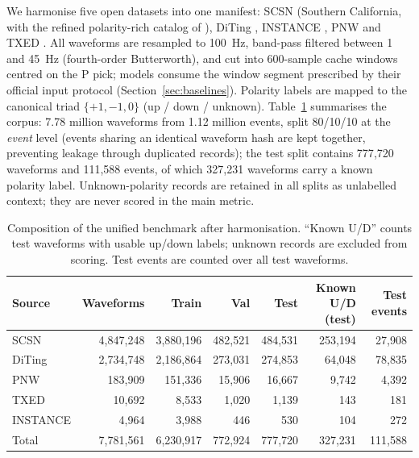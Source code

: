 \documentclass[11pt]{article}
\begin{document}
We harmonise five open datasets into one manifest:
SCSN (Southern California, with the refined polarity-rich catalog of
\citealp{ross2018,cheng2023focal}), DiTing \citep{zhao2023diting},
INSTANCE \citep{michelini2021instance}, PNW \citep{ni2023pnw} and TXED
\citep{chen2024txed}. All waveforms are resampled to \SI{100}{Hz}, band-pass
filtered between 1 and \SI{45}{Hz} (fourth-order Butterworth), and cut into
600-sample cache windows centred on the P pick; models consume the window
segment prescribed by their official input protocol
(Section~\ref{sec:baselines}). Polarity labels are mapped to the canonical
triad $\{+1, -1, 0\}$ (up / down / unknown). Table~\ref{tab:dataset}
summarises the corpus: 7.78 million waveforms from 1.12 million
events, split 80/10/10 at the \emph{event} level (events sharing an identical
waveform hash are kept together, preventing leakage through duplicated
records); the test split contains 777{,}720 waveforms and
111{,}588 events, of which 327{,}231 waveforms carry a known polarity
label. Unknown-polarity records are retained in all splits as unlabelled
context; they are never scored in the main metric.

\begin{table}[t]
  \centering
  \caption{Composition of the unified benchmark after harmonisation.
  ``Known U/D'' counts test waveforms with usable up/down labels; unknown
  records are excluded from scoring. Test events are counted over all test
  waveforms.}
  \label{tab:dataset}
  \small
  \begin{tabular}{lrrrrrr}
    \toprule
    Source & Waveforms & Train & Val & Test & Known U/D (test) & Test events \\
    \midrule
    SCSN     & 4{,}847{,}248 & 3{,}880{,}196 & 482{,}521 & 484{,}531 & 253{,}194 & 27{,}908 \\
    DiTing   & 2{,}734{,}748 & 2{,}186{,}864 & 273{,}031 & 274{,}853 & 64{,}048 & 78{,}835 \\
    PNW      &   183{,}909 &   151{,}336 &  15{,}906 &  16{,}667 & 9{,}742 & 4{,}392 \\
    TXED     &    10{,}692 &     8{,}533 &   1{,}020 &   1{,}139 & 143 & 181 \\
    INSTANCE &     4{,}964 &     3{,}988 &     446 &     530 & 104 & 272 \\
    \midrule
    Total    & 7{,}781{,}561 & 6{,}230{,}917 & 772{,}924 & 777{,}720 & 327{,}231 & 111{,}588 \\
    \bottomrule
  \end{tabular}
\end{table}
\end{document}
